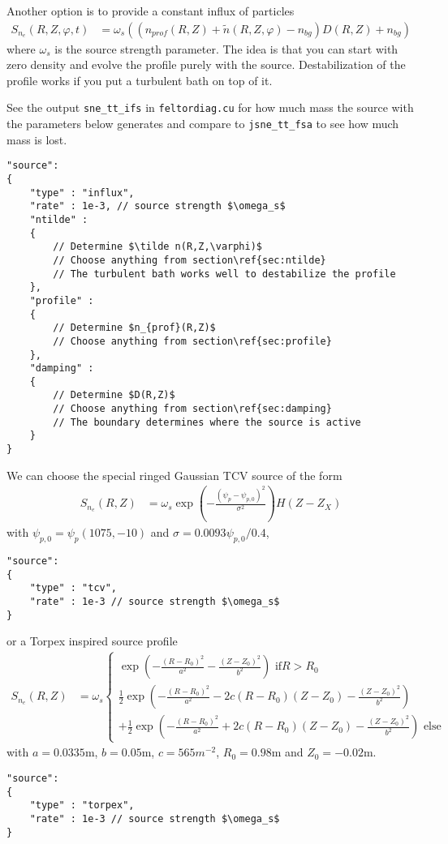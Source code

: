 Another option is to provide a constant influx of particles
\begin{align}
    S_{n_e}(R,Z,\varphi, t) &= \omega_s \left( (n_{prof}(R,Z) + \tilde n(R,Z,\varphi) - n_{bg})D(R,Z) + n_{bg}\right)
\end{align}
where $\omega_s$ is the source strength parameter.
The idea is that you can start with zero density and evolve the profile purely
with the source. Destabilization of the profile works if you put a turbulent
bath on top of it.
\begin{tcolorbox}[title=Note]
    See the output \texttt{sne_tt_ifs} in \texttt{feltordiag.cu} for how much mass
the source with the parameters below generates and compare to
\texttt{jsne_tt_fsa} to see how much mass is lost.
\end{tcolorbox}
\begin{verbatim}
"source":
{
    "type" : "influx",
    "rate" : 1e-3, // source strength $\omega_s$
    "ntilde" :
    {
        // Determine $\tilde n(R,Z,\varphi)$
        // Choose anything from section\ref{sec:ntilde}
        // The turbulent bath works well to destabilize the profile
    },
    "profile" :
    {
        // Determine $n_{prof}(R,Z)$
        // Choose anything from section\ref{sec:profile}
    },
    "damping" :
    {
        // Determine $D(R,Z)$
        // Choose anything from section\ref{sec:damping}
        // The boundary determines where the source is active
    }
}
\end{verbatim}

We can choose the special ringed Gaussian TCV source of the form
\begin{align}
    S_{n_e}(R,Z) &= \omega_s \exp\left( -\frac{(\psi_p-\psi_{p,0})^2}{\sigma^2}\right)H(Z-Z_X)
\end{align}
with $\psi_{p,0} = \psi_p(1075, -10)$ and $\sigma = 0.0093\psi_{p,0}/0.4$,
\begin{verbatim}
"source":
{
    "type" : "tcv",
    "rate" : 1e-3 // source strength $\omega_s$
}
\end{verbatim}
or a Torpex inspired source profile
\begin{align} \label{eq:electron_source_torpex}
  S_{n_e}(R,Z) &= \omega_s
  \begin{cases}
    \exp\left( - \frac{(R-R_0)^2}{a^2 }- \frac{(Z-Z_0)^2}{b^2}\right) \text{ if} R > R_0 \\
    \frac{1}{2}\exp\left( - \frac{(R-R_0)^2}{a^2} -2c(R-R_0)(Z-Z_0)- \frac{(Z-Z_0)^2}{b^2} \right) \\
  +\frac{1}{2}\exp\left( - \frac{(R-R_0)^2}{a^2} +2c(R-R_0)(Z-Z_0)- \frac{(Z-Z_0)^2}{b^2} \right) \text{ else}
  \end{cases}
\end{align}
with $a=0.0335$m, $b=0.05$m, $c=565m^{-2}$, $R_0=0.98$m and $Z_0=-0.02$m.
\begin{verbatim}
"source":
{
    "type" : "torpex",
    "rate" : 1e-3 // source strength $\omega_s$
}
\end{verbatim}

